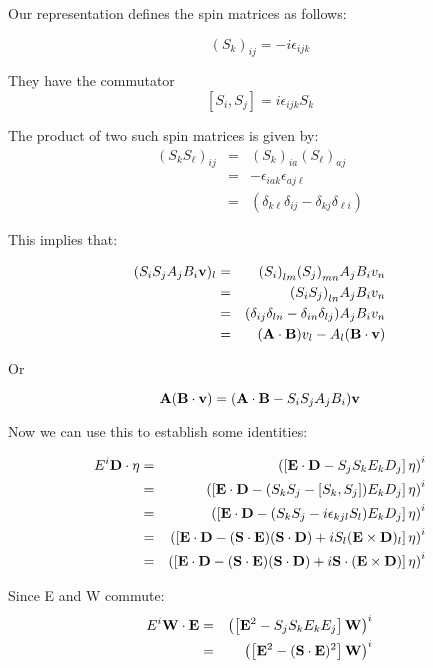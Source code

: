 Our representation defines the spin matrices as follows:

$${(S_k)}_{ij}=-i \epsilon_{ijk}$$

They have the commutator
$$	[S_i, S_j] = i \epsilon_{ijk} S_k $$

The product of two such spin matrices is given by:
\begin{eqnarray*}
{(S_k S_\ell)}_{ij} 
	& = & {(S_k)}_{ia} {(S_\ell)}_{aj} \\
	& = & -\epsilon_{iak} \epsilon_{aj\ell} \\
	& = & (\delta_{k\ell} \delta_{ij} - \delta_{kj} \delta_{\ell i} )
\end{eqnarray*}

This implies that:

\begin{eqnarray*}
(S_i S_j A_j B_i \mathbf{v} )_l 
	&=&  	{(S_i)}_{lm} {(S_j)}_{mn} A_j B_i v_n \\
	&=&	{(S_iS_j)}_{ln} A_j B_i v_n \\
	&=&	 (\delta_{ij} \delta_{ln} - \delta_{in} \delta_{lj} ) A_j B_i v_n \\
	&=&	(\mathbf{A} \cdot \mathbf{B}) v_l  - A_l ( \mathbf{B} \cdot \mathbf{v}) \\
\end{eqnarray*}

Or 

$$ \mathbf{A} (\mathbf{B} \cdot \mathbf{v}) =  (\mathbf{A} \cdot \mathbf{B}   -  S_i S_j A_j B_i) \mathbf{v} $$

Now we can use this to establish some identities:

\begin{eqnarray*}
 E^i \mathbf{D} \cdot \mathbf{\eta}
	&=&	\left( \left[\mathbf{E} \cdot \mathbf{D}  - S_j S_k E_k D_j\right] \mathbf{\eta} \right)^i		\\
	&=&	\left( \left[\mathbf{E} \cdot \mathbf{D}  - (S_k S_j  - [S_k, S_j] ) E_k D_j \right] \mathbf{\eta} \right)^i \\
	&=&	\left( \left[\mathbf{E} \cdot \mathbf{D}  - (S_k S_j - i \epsilon_{kjl} S_l ) E_k D_j \right] \mathbf{\eta} \right)^i	  \\
	&=&	\left( \left[\mathbf{E} \cdot \mathbf{D}  - (\mathbf{S} \cdot \mathbf{E})( \mathbf{S} \cdot \mathbf{D}) +  i  S_l (\mathbf{E} \times \mathbf{D})_l \right] \mathbf{\eta} \right)^i	  \\
	&=&	\left( \left[\mathbf{E} \cdot \mathbf{D}  - (\mathbf{S} \cdot \mathbf{E})( \mathbf{S} \cdot \mathbf{D}) +  i  \mathbf{S} \cdot (\mathbf{E} \times \mathbf{D})\right] \mathbf{\eta} \right)^i
\end{eqnarray*}

Since E and W commute:
\begin{eqnarray*}
 E^i \mathbf{W} \cdot \mathbf{E}
	&=& \left( \left[\mathbf{E}^2  - S_j S_k E_k E_j\right] \mathbf{W} \right)^i		\\
	&=& \left( \left[\mathbf{E}^2  - (\mathbf{S} \cdot \mathbf{E} )^2 \right] \mathbf{W} \right)^i		\\
\end{eqnarray*}

